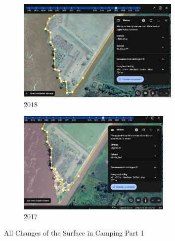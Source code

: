 \begin{figure}[H]
    \begin{subfigure}[b]{0.48\textwidth}
        \includegraphics[width=\linewidth, height =5cm]{figures/appendix-g/opp2018.png}
        \caption{2018}
        \label{fig:second}
    \end{subfigure}
    \hfill
    \begin{subfigure}[b]{0.48\textwidth}
        \includegraphics[width=\linewidth, height =5cm]{figures/appendix-g/opp2017.png}
        \caption{2017}
        \label{fig:second}
    \end{subfigure}

    \caption{All Changes of the Surface in Camping Part 1}
    \label{fig:All Changes of the Surface in Camping Part 1}
\end{figure}


